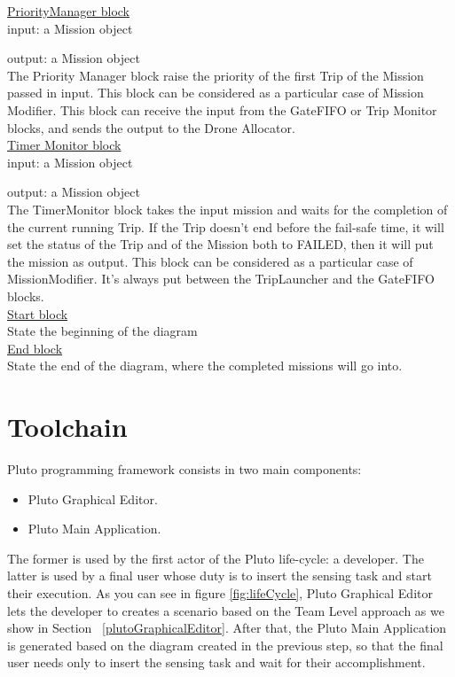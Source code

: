 \underline{PriorityManager block}
\\

input: a Mission object

output: a Mission object
\\

The Priority Manager block raise the priority of the first Trip of the Mission passed in input.
This block can be considered as a particular case of Mission Modifier. 
This block can receive the input from the GateFIFO or Trip Monitor blocks, and sends the output to the Drone Allocator.
\\

\underline{Timer Monitor block}
\\

input: a Mission object

output: a Mission object
\\

The TimerMonitor block takes the input mission and waits for the completion of the current running Trip. If the Trip doesn't end before the fail-safe time, it will set the status of the Trip and of the Mission both to FAILED, then it will put the mission as output.
This block can be considered as a particular case of MissionModifier.
It's always put between the TripLauncher and the GateFIFO blocks.
\\


\underline{Start block}
\\
State the beginning of the diagram
\\

\underline{End block}
\\
State the end of the diagram, where the completed missions will go into.
\\


\section{Toolchain}\label{architecture}

Pluto programming framework consists in two main components:
\begin{itemize}
\item Pluto Graphical Editor.
\item Pluto Main Application.
\end{itemize}
The former is used by the first actor of the Pluto life-cycle: a developer. The latter is used by a final user whose duty is to insert the sensing task and start their execution.
As you can see in figure \ref{fig:lifeCycle}, Pluto Graphical Editor lets the developer to creates a scenario based on the Team Level approach as we show in Section ~\ref{plutoGraphicalEditor}. After that, the Pluto Main Application is generated based on the diagram created in the previous step, so that the final user needs only to insert the sensing task and wait for their accomplishment.


